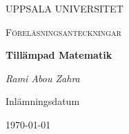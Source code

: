 \begin{titlepage}

  \centering
	{\scshape\LARGE UPPSALA UNIVERSITET\par}
	\vspace{1cm}
  {\scshape\Large {Föreläsningsanteckningar} \par}
	\vspace{1.5cm}
  {\huge\bfseries {Tillämpad Matematik} \par}
	\vspace{2cm}
	{\Large\itshape Rami Abou Zahra \par}
	\vfill
  \vfill


  {\large Inlämningsdatum}\par
  {\today}

\end{titlepage}
